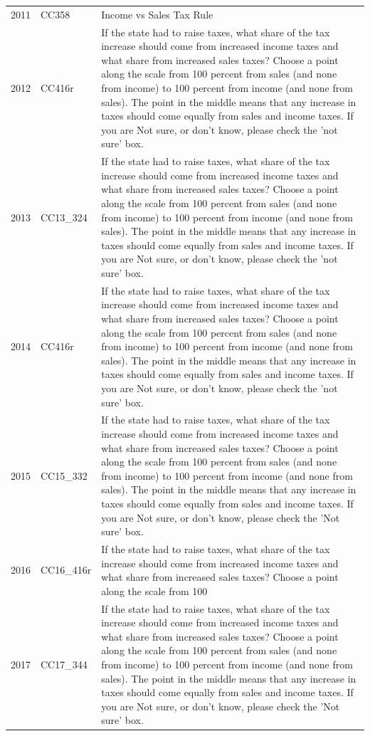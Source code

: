 \documentclass[12pt]{article}
\begin{document}
\begin{longtable}[t]{rl>{\raggedright\arraybackslash}p{10cm}}
2011 & CC358 & Income vs Sales Tax Rule\\
2012 & CC416r & If the state had to raise taxes, what share of the tax increase should come from increased income taxes and what share from increased sales taxes? Choose a point along the scale from 100 percent from sales (and none from income) to 100 percent from income (and none from sales). The point in the middle means that any increase in taxes should come equally from sales and income taxes. If you are Not sure, or don't know, please check the 'not sure' box.\\
2013 & CC13\_324 & If the state had to raise taxes, what share of the tax increase should come from increased income taxes and what share from increased sales taxes? Choose a point along the scale from 100 percent from sales (and none from income) to 100 percent from income (and none from sales). The point in the middle means that any increase in taxes should come equally from sales and income taxes. If you are Not sure, or don't know, please check the 'not sure' box.\\
2014 & CC416r & If the state had to raise taxes, what share of the tax increase should come from increased income taxes and what share from increased sales taxes? Choose a point along the scale from 100 percent from sales (and none from income) to 100 percent from income (and none from sales). The point in the middle means that any increase in taxes should come equally from sales and income taxes. If you are Not sure, or don't know, please check the 'not sure' box.\\
2015 & CC15\_332 & If the state had to raise taxes, what share of the tax increase should come from increased income taxes and what share from increased sales taxes? Choose a point along the scale from 100 percent from sales (and none from income) to 100 percent from income (and none from sales). The point in the middle means that any increase in taxes should come equally from sales and income taxes. If you are Not sure, or don't know, please check the 'Not sure' box.\\
2016 & CC16\_416r & If the state had to raise taxes, what share of the tax increase should come from increased income taxes and what share from increased sales taxes? Choose a point along the scale from 100\\
2017 & CC17\_344 & If the state had to raise taxes, what share of the tax increase should come from increased income taxes and what share from increased sales taxes? Choose a point along the scale from 100 percent from sales (and none from income) to 100 percent from income (and none from sales). The point in the middle means that any increase in taxes should come equally from sales and income taxes. If you are Not sure, or don't know, please check the 'Not sure' box.\\*
\end{longtable}
\end{document}
